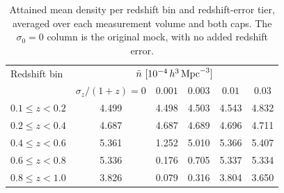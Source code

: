 \begin{table}[t]
\caption{\label{tab:baseline_density}Attained mean density per redshift bin and redshift-error tier, averaged over each measurement volume and both caps. The $\sigma_0=0$ column is the original mock, with no added redshift error.}
\begin{ruledtabular}
\begin{tabular}{lccccc}
Redshift bin & \multicolumn{5}{c}{$\bar n\ [10^{-4}\,h^3\,{\rm Mpc}^{-3}]$} \\
 & $\sigma_z/(1+z)=0$ & $0.001$ & $0.003$ & $0.01$ & $0.03$ \\
\hline
$0.1\leq z<0.2$ & 4.499 & 4.498 & 4.503 & 4.543 & 4.832 \\
$0.2\leq z<0.4$ & 4.687 & 4.687 & 4.689 & 4.696 & 4.711 \\
$0.4\leq z<0.6$ & 5.361 & 1.252 & 5.010 & 5.366 & 5.407 \\
$0.6\leq z<0.8$ & 5.336 & 0.176 & 0.705 & 5.337 & 5.334 \\
$0.8\leq z<1.0$ & 3.826 & 0.079 & 0.316 & 3.804 & 3.650 \\
\end{tabular}
\end{ruledtabular}
\end{table}
